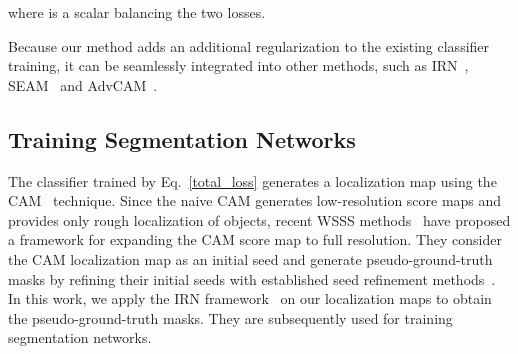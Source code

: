 \documentclass[10pt,twocolumn,letterpaper]{article}
\begin{document}
where  is a scalar balancing the two losses.


Because our method adds an additional regularization  to the existing classifier training, it can be seamlessly integrated into other methods, such as IRN~\cite{ahn2019weakly}, SEAM~\cite{wang2020self} and AdvCAM~\cite{lee2021anti}.




\subsection{Training Segmentation Networks}\label{method_trainseg}
The classifier  trained by Eq.~\ref{total_loss} generates a localization map using the CAM~\cite{zhou2016learning} technique.
Since the naive CAM generates low-resolution score maps and provides only rough localization of objects, recent WSSS methods~\cite{lee2019ficklenet, wang2020self, lee2021reducing, su2021context, lee2021anti, zhang2020causal} have proposed a framework for expanding the CAM score map to full resolution. They consider the CAM localization map as an initial seed and generate pseudo-ground-truth masks by refining their initial seeds with established seed refinement methods~\cite{huang2018weakly, ahn2018learning, ahn2019weakly, kolesnikov2016seed}. 
In this work, we apply the IRN framework~\cite{ahn2019weakly} on our localization maps to obtain the pseudo-ground-truth masks. They are subsequently used for training segmentation networks.
\end{document}
